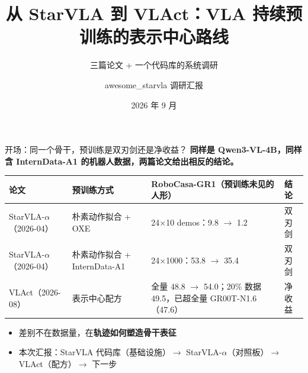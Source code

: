 \documentclass[aspectratio=169,10pt]{beamer}
\title[awesome\_starvla]{从 StarVLA 到 VLAct：VLA 持续预训练的表示中心路线}
\subtitle{三篇论文 + 一个代码库的系统调研}
\author{awesome\_starvla 调研汇报}
\institute{github.com/asimfish/awesome\_starvla}
\date{2026 年 9 月}
\newcommand{\con}[1]{\textcolor{negative}{#1}}
\newcommand{\HL}[1]{\textcolor{emphasis}{#1}}
\begin{document}
\begin{frame}
  \titlepage
\end{frame}

\begin{frame}{开场：同一个骨干，预训练是双刃剑还是净收益？}
  \textbf{同样是 Qwen3-VL-4B，同样含 InternData-A1 的机器人数据，两篇论文给出相反的结论。}
  \vspace{4pt}
  \begin{center}\footnotesize
  \begin{tabular}{p{2.5cm}p{3.6cm}p{5.4cm}p{1.2cm}}
    \toprule
    论文 & 预训练方式 & RoboCasa-GR1（预训练未见的人形） & 结论 \\
    \midrule
    StarVLA-$\alpha$（2026-04） & 朴素动作拟合 + OXE & 24$\times$10 demos：9.8 $\to$ \con{1.2} & 双刃剑 \\
    StarVLA-$\alpha$（2026-04） & 朴素动作拟合 + InternData-A1 & 24$\times$1000：53.8 $\to$ \con{35.4} & 双刃剑 \\
    VLAct（2026-08） & 表示中心配方 & 全量 48.8 $\to$ \HL{54.0}；20\% 数据 \HL{49.5}，已超全量 GR00T-N1.6（47.6） & 净收益 \\
    \bottomrule
  \end{tabular}
  \end{center}
  \vspace{4pt}
  \begin{itemize}
    \item 差别不在数据量，在\textbf{轨迹如何塑造骨干表征}
    \item 本次汇报：StarVLA 代码库（基础设施）$\to$ StarVLA-$\alpha$（对照板）$\to$ VLAct（配方）$\to$ 下一步
  \end{itemize}
\end{frame}
\end{document}
